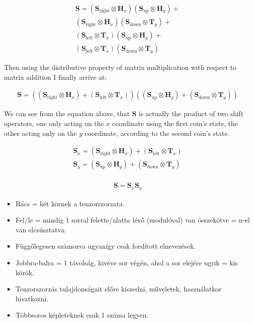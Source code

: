 \begin{align*} 
    \mathbf{S} =   
    (\mathbf{S}_{\text{right}} \otimes \mathbf{H}_x) (\mathbf{S}_{\text{up}} \otimes \mathbf{H}_y) + \\
    (\mathbf{S}_{\text{right}} \otimes \mathbf{H}_x) (\mathbf{S}_{\text{down}} \otimes \mathbf{T}_y) + \\
    (\mathbf{S}_{\text{left}} \otimes \mathbf{T}_x) (\mathbf{S}_{\text{up}} \otimes \mathbf{H}_y) + \\
    (\mathbf{S}_{\text{left}} \otimes \mathbf{T}_x) (\mathbf{S}_{\text{down}} \otimes \mathbf{T}_y)\phantom{+}
\end{align*}

Then using the distributive property of matrix multiplication with respect to matrix addition I finally arrive at:

\begin{align*} 
    \mathbf{S} =   
    ((\mathbf{S}_{\text{right}} \otimes \mathbf{H}_x) + (\mathbf{S}_{\text{left}} \otimes \mathbf{T}_x))
    ((\mathbf{S}_{\text{up}} \otimes \mathbf{H}_y) + (\mathbf{S}_{\text{down}} \otimes \mathbf{T}_y))
\end{align*}

We can see from the equation above, that $\mathbf{S}$ is actually the product of two shift operators, one only
acting on the $x$ coordinate using the first coin's state, the other acting only on the $y$ coordinate, according to the second
coin's state.

\begin{align*} 
    \mathbf{S}_x = (\mathbf{S}_{\text{right}} \otimes \mathbf{H}_x) + (\mathbf{S}_{\text{left}} \otimes \mathbf{T}_x) \\
    \mathbf{S}_y = (\mathbf{S}_{\text{up}} \otimes \mathbf{H}_y) + (\mathbf{S}_{\text{down}} \otimes \mathbf{T}_y) \\
\end{align*}    

\begin{align*}
    \mathbf{S} = \mathbf{S}_x\mathbf{S}_y
\end{align*}


\begin{itemize}
  \item Rács = két körnek a tenzorszorzata.
  \item Fel/le = mindig 1 sorral felette/alatta lévő (modulóval) van összekötve = n-el van elcsúsztatva.
  \item Függőlegesen számozva ugyanígy csak fordított elnevezések.
  \item Jobbra-balra = 1 távolság, kivéve sor végén, ahol a sor elejére ugrik = kis körök.
  \item Tenzorszorzás tulajdonságait előre kiszedni, műveletek, használatkor hivatkozni.
  \item Többsoros képleteknek csak 1 száma legyen.
\end{itemize}


